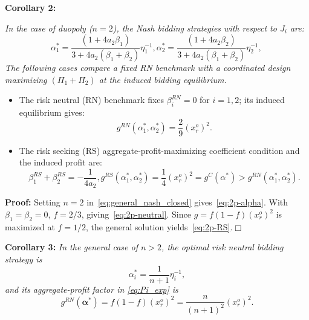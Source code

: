 \documentclass[journal]{IEEEtran}
\begin{document}
\noindent  \textbf{Corollary 2:} {\it In the case of duopoly ($n=2$), the Nash bidding strategies with respect to $J_i$ are:
\begin{subequations}
\label{eq:2p-alpha}
\begin{equation}
\alpha_1^*= \frac{(1+4a_2\beta_1)}{3+4a_2(\beta_1+\beta_2)}\eta_1^{-1}, 
\label{eq:2p-alpha1}
\end{equation} 
\begin{equation}
 \alpha_2^*= \frac{(1+4a_2\beta_2)}{3+4a_2(\beta_1+\beta_2)}\eta_2^{-1}, \, 
\label{eq:2p-alpha2}
\end{equation} 
\end{subequations}
The following cases compare a fixed RN benchmark with a coordinated design maximizing $(\Pi_1+\Pi_2)$ at the induced bidding equilibrium.
\begin{itemize}
\item The risk neutral (RN) benchmark fixes $\beta_i^{RN}=0$ for $i=1,2$; its induced equilibrium gives:
\begin{equation}
g^{RN}(\alpha_1^*, \alpha_2^*)  =  \frac{2}{9}(x_r^o)^2. 
\label{eq:2p-neutral}
\end{equation} 
\item The risk seeking (RS) aggregate-profit-maximizing coefficient condition and the induced profit are:
\begin{subequations}
\label{eq:2p-RS}
\begin{equation}
\beta_1^{RS}+\beta_2^{RS}=-\frac{1}{4a_2},
\label{eq:2p-RS-beta}
\end{equation} 
\begin{equation}
g^{RS}(\alpha_1^*,\alpha_2^*) = \frac{1}{4}(x_r^o)^2 = g^C(\alpha^*)   > g^{RN}(\alpha_1^*, \alpha_2^*). 
\label{eq:2p-RS-g}
\end{equation} 
\end{subequations}
\end{itemize} }

\noindent\textbf{Proof:} Setting $n=2$ in~\eqref{eq:general_nash_closed} gives~\eqref{eq:2p-alpha}. With $\beta_1=\beta_2=0$, $f=2/3$, giving~\eqref{eq:2p-neutral}. Since $g=f(1-f)(x_r^o)^2$ is maximized at $f=1/2$, the general solution yields~\eqref{eq:2p-RS}.\hfill$\Box$

\noindent  \textbf{Corollary 3:} {\it In the general case of $n>2$, the optimal risk neutral bidding strategy is
\begin{equation}
    \alpha_i^* = \frac{1}{n+1}\eta_i^{-1},\label{eq:alpha_i_0} 
\end{equation} 
and its aggregate-profit factor in \eqref{eq:Pi_exp} is
\[ g^{RN}(\boldsymbol{\alpha}^*)=f(1-f)(x_r^o)^2=\frac{n}{(n+1)^2} (x_r^o)^2. \]}
\end{document}
